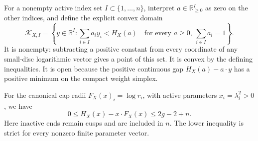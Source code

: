 For a nonempty active index set $I\subset\{1,\ldots,n\}$, interpret $a\in\mathbb R_{\geq0}^I$ as zero on the other indices, and define the explicit convex domain
\[
 \mathcal K_{X,I}
 =\left\{y\in\mathbb R^I:
       \sum_{i\in I}a_i y_i<H_X(a)
       \quad\text{for every }a\geq0,\ \sum_{i\in I}a_i=1\right\}.
\]
It is nonempty: subtracting a positive constant from every coordinate of any small-disc logarithmic vector gives a point of this set. It is convex by the defining inequalities. It is open because the positive continuous gap $H_X(a)-a\cdot y$ has a positive minimum on the compact weight simplex.

\begin{proposition}
\label{C:A2b-gap}
For the canonical cap radii $F_X(x)_i=\log r_i$, with active parameters $x_i=\lambda_i^2>0$, we have
\[
 0\leq H_X(x)-x\cdot F_X(x)\leq2g-2+n.
\]
Here inactive ends remain cusps and are included in $n$. The lower inequality is strict for every nonzero finite parameter vector.
\end{proposition}
